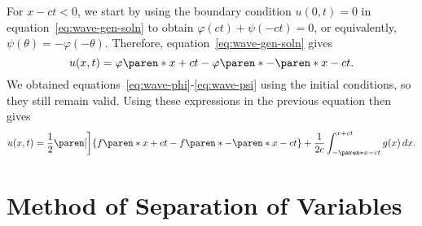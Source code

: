 \documentclass[11pt]{penrose}
\begin{document}
For $x - ct < 0$, we start by using the boundary condition $u(0, t) = 0$ in equation~\eqref{eq:wave-gen-soln} to obtain $\varphi(ct) + \psi(-ct) = 0$, or equivalently, $\psi(\theta) = - \varphi(-\theta)$. Therefore, equation~\eqref{eq:wave-gen-soln} gives
\begin{equation}
    u(x, t) = \varphi\paren*{x + ct} - \varphi\paren*{-\paren*{x - ct}}.
\end{equation}
We obtained equations~\eqref{eq:wave-phi}-\eqref{eq:wave-psi} using the initial conditions, so they still remain valid. Using these expressions in the previous equation then gives
\begin{equation}
    u(x, t)
    = \frac{1}{2} \paren[\bigg]{f\paren*{x + ct} - f\paren*{-\paren*{x - ct}}}
    + \frac{1}{2c} \int_{-\paren*{x - ct}}^{x + ct} g(x) \,dx.
    \label{eq:wave-soln-semiinfinite}
\end{equation}





\section{Method of Separation of Variables}
\end{document}
